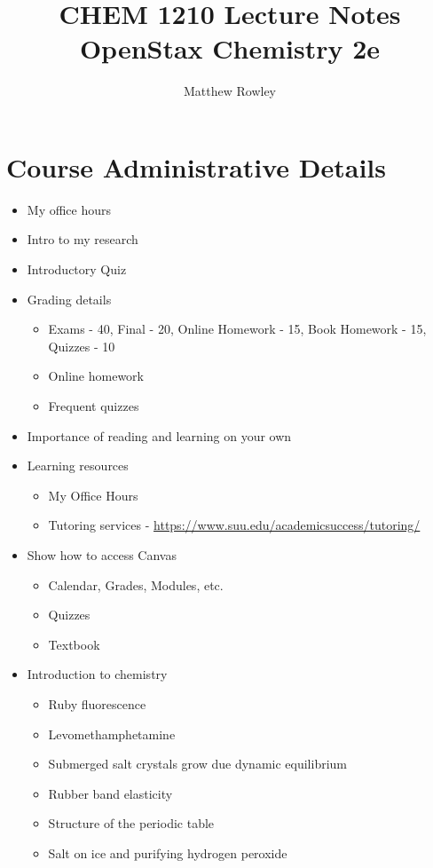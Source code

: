 \documentclass[12pt, openany, letterpaper]{memoir}
\begin{document}
\title{CHEM 1210 Lecture Notes\\ OpenStax Chemistry 2e}
\author{Matthew Rowley}
\mainmatter
\maketitle
\chapter*{Course Administrative Details}
\begin{itemize}
	\item My office hours
	\item Intro to my research
	\item Introductory Quiz
	\item Grading details
	      \begin{itemize}
		      \item Exams - 40, Final - 20, Online Homework - 15, Book Homework - 15, Quizzes - 10
		      \item Online homework
		      \item Frequent quizzes
	      \end{itemize}
	\item Importance of reading and learning on your own
	\item Learning resources
	      \begin{itemize}
		      \item My Office Hours
		      \item Tutoring services - \href{https://www.suu.edu/academicsuccess/tutoring/}{https://www.suu.edu/academicsuccess/tutoring/}
	      \end{itemize}
	\item Show how to access Canvas
	      \begin{itemize}
		      \item Calendar, Grades, Modules, etc.
		      \item Quizzes
		      \item Textbook
	      \end{itemize}
	\item Introduction to chemistry
	      \begin{itemize}
		      \item Ruby fluorescence
		      \item Levomethamphetamine
          \item Submerged salt crystals grow due dynamic equilibrium
		      \item Rubber band elasticity
		      \item Structure of the periodic table
		      \item Salt on ice and purifying hydrogen peroxide
	      \end{itemize}
\end{itemize}
\end{document}
